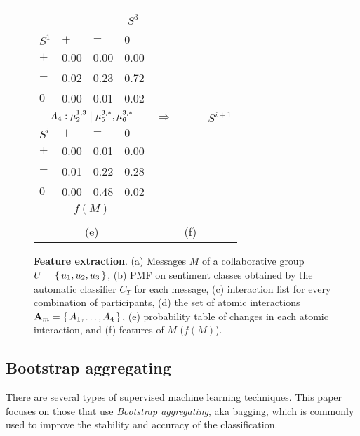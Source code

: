 \documentclass[3p,times,preprint]{elsarticle}
\newcommand{\csentence}[1]{\textbf{#1}.\;}
\begin{document}
\begin{figure}[t!]
\begin{tabularx}{0.98\textwidth}{XXXXp{0.4cm}>{\centering\arraybackslash}p{3.8cm}p{0.4cm}}
{\begin{tabular}[t!]{lccc}
     \end{tabular}
     }&{
     \footnotesize
    \begin{tabular}[t!]{lccc}
     & \multicolumn{3}{c}{$S^3$}\\
     \cmidrule{2-4}
     $S^1$ & $+$ & $-$ & $0$  \\
     \midrule
    $+$ & 0.00 & 0.00 & 0.00\\
    $-$ & 0.02 & 0.23 & 0.72\\
    $0$ & 0.00 & 0.01 & 0.02\\
     \midrule
    \multicolumn{4}{c}{$A_4:\mu_2^{1,3} \;\big\vert \;  \mu_5^{3,*},\mu_6^{3,*} $} 
     \end{tabular}
     }     &{\Large$\Rightarrow$}
     &
     {
    \footnotesize
    \begin{tabular}[t!]{p{0.7cm}ccc}
     & \multicolumn{3}{c}{$S^{i+1}$}\\
     \cmidrule{2-4}
       $S^{i}$  & $+$ & $-$ & $0$  \\
        \midrule
        $+$ & 0.00 & 0.01 & 0.00\\
        $-$ & 0.01 & 0.22 & 0.28\\
        $0$ & 0.00 & 0.48 & 0.02\\
        \midrule
        \multicolumn{4}{c}{$f(M)$}\\
    \end{tabular}
    }     
    \\
     \multicolumn{4}{c}{\rule{0pt}{14pt}(e)}
    & &
    (f)\\
    \end{tabularx}
     \caption{\csentence{Feature extraction} (a) Messages $M$ of a collaborative group $U = \set{u_1,u_2,u_3}$, (b)  PMF on sentiment classes obtained by the automatic classifier $C_T$ for each message, (c) interaction list for every combination of participants, (d) the set of atomic interactions $\textbf{A}_m = \set{A_1, \ldots, A_4}$, (e) probability table of changes in each atomic interaction, and (f) features of $M$ ($f(M)$).}
     \label{fig:features}
\end{figure}




\subsection{Bootstrap aggregating}
There are several types of supervised machine learning techniques. This paper focuses on those that use \textit{Bootstrap aggregating}, aka bagging, which is commonly used to improve the stability and accuracy of the classification.
\end{document}
